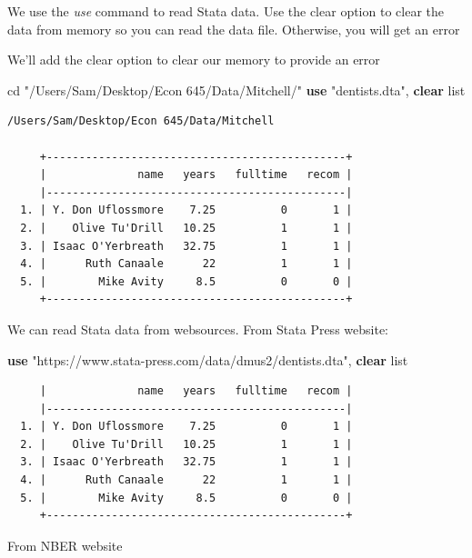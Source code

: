 \documentclass[
]{book}
\newenvironment{Shaded}{\begin{snugshade}}{\end{snugshade}}
\newcommand{\KeywordTok}[1]{\textcolor[rgb]{0.13,0.29,0.53}{\textbf{#1}}}
\newcommand{\NormalTok}[1]{#1}
\newcommand{\OtherTok}[1]{\textcolor[rgb]{0.56,0.35,0.01}{#1}}
\newcommand{\StringTok}[1]{\textcolor[rgb]{0.31,0.60,0.02}{#1}}
\begin{document}
We use the \emph{use} command to read Stata data. Use the clear option to clear the data from memory so you can read the data file. Otherwise, you will get an error

We'll add the clear option to clear our memory to provide an error

\begin{Shaded}
\begin{Highlighting}[]
\NormalTok{cd }\StringTok{"/Users/Sam/Desktop/Econ 645/Data/Mitchell/"}
\KeywordTok{use} \StringTok{"dentists.dta"}\NormalTok{, }\KeywordTok{clear}
\OtherTok{list}  
\end{Highlighting}
\end{Shaded}

\begin{verbatim}
/Users/Sam/Desktop/Econ 645/Data/Mitchell

     +----------------------------------------------+
     |              name   years   fulltime   recom |
     |----------------------------------------------|
  1. | Y. Don Uflossmore    7.25          0       1 |
  2. |    Olive Tu'Drill   10.25          1       1 |
  3. | Isaac O'Yerbreath   32.75          1       1 |
  4. |      Ruth Canaale      22          1       1 |
  5. |        Mike Avity     8.5          0       0 |
     +----------------------------------------------+
\end{verbatim}

We can read Stata data from websources. From Stata Press website:

\begin{Shaded}
\begin{Highlighting}[]
\KeywordTok{use} \StringTok{"https://www.stata{-}press.com/data/dmus2/dentists.dta"}\NormalTok{, }\KeywordTok{clear}
\OtherTok{list}
\end{Highlighting}
\end{Shaded}

\begin{verbatim}
     |              name   years   fulltime   recom |
     |----------------------------------------------|
  1. | Y. Don Uflossmore    7.25          0       1 |
  2. |    Olive Tu'Drill   10.25          1       1 |
  3. | Isaac O'Yerbreath   32.75          1       1 |
  4. |      Ruth Canaale      22          1       1 |
  5. |        Mike Avity     8.5          0       0 |
     +----------------------------------------------+
\end{verbatim}

From NBER website
\end{document}
